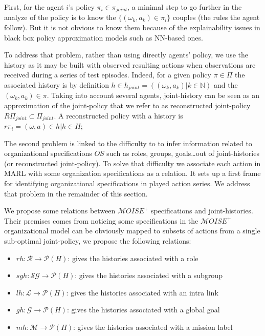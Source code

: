\documentclass[runningheads]{llncs}
\newcounter{relation}
\begin{document}
First, for the agent $i$'s policy $\pi_{i} \in \pi_{joint}$, a minimal step to go further in the analyze of the policy is to know the $\{(\omega_k, a_k) \in \pi_{i}\}$ couples (the rules the agent follow). But it is not obvious to know them because of the explainability issues in black box policy approximation models such as NN-based ones.

To address that problem, rather than using directly agents' policy, we use the history as it may be built with observed resulting actions when observations are received during a series of test episodes. Indeed, for a given policy $\pi \in \Pi$ the associated history is by definition $h \in h_{joint} = ((\omega_k,a_k) | k \in \mathbb{N})$ and the $(\omega_k,a_k) \in \pi$. Taking into account several agents, joint-history can be seen as an approximation of the joint-policy that we refer to as reconstructed joint-policy $R\Pi_{joint} \subset \Pi_{joint}$. A reconstructed policy with a history is $r\pi_i = {(\omega, a) \in h | h \in H}$;

The second problem is linked to the difficulty to to infer information related to organizational specifications $OS$ such as roles, groups, goals\dots out of joint-histories (or reconstructed joint-policy).
To solve that difficulty we associate each action in MARL with some organization specifications as a  relation. It sets up a first frame for identifying organizational specifications in played action series. We address that problem in the remainder of this section.

We propose some relations between $\mathcal{M}OISE^+$ specifications and joint-histories. Their premises comes from noticing some specifications in the $\mathcal{M}OISE^+$ organizational model can be obviously mapped to subsets of actions from a single sub-optimal joint-policy, we propose the following relations:

\begin{itemize}
    \item $rh: \mathcal{R} \rightarrow \mathcal{P}(H)$: gives the histories associated with a role
    \item $sgh: \mathcal{SG} \rightarrow \mathcal{P}(H)$: gives the histories associated with a subgroup
    \item $lh: \mathcal{L} \rightarrow \mathcal{P}(H)$: gives the histories associated with an intra link
    \item $gh: \mathcal{G} \rightarrow \mathcal{P}(H)$: gives the histories associated with a global goal
    \item $mh: \mathcal{M} \rightarrow \mathcal{P}(H)$: gives the histories associated with a mission label
\end{itemize}
\end{document}
